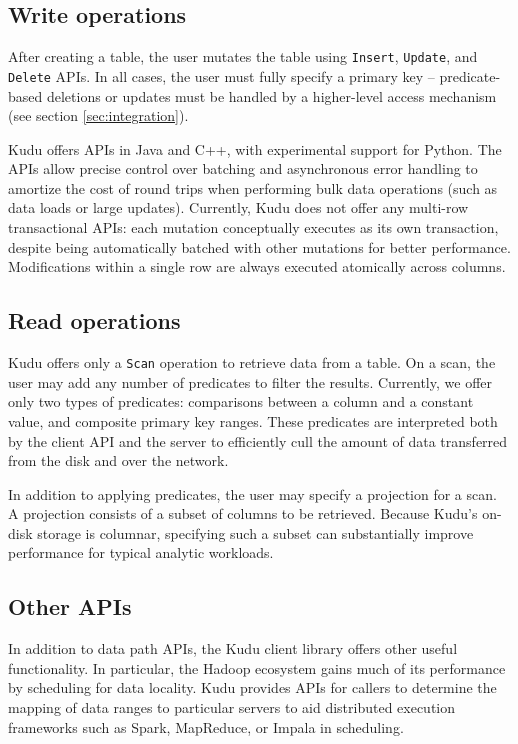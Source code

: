\documentclass[twocolumn,9pt]{article}
\begin{document}
\subsection{Write operations}
After creating a table, the user mutates the table using {\tt Insert}, {\tt Update}, and {\tt Delete}
APIs. In all cases, the user must fully specify a primary key -- predicate-based deletions or updates
must be handled by a higher-level access mechanism (see section {\ref{sec:integration}}).

Kudu offers APIs in Java and C++, with experimental support for Python. The APIs allow
precise control over batching and asynchronous error handling to amortize the cost of round trips
when performing bulk data operations (such as data loads or large updates). Currently, Kudu does
not offer any multi-row transactional APIs: each mutation conceptually executes as its own transaction,
despite being automatically batched with other mutations for better performance. Modifications within
a single row are always executed atomically across columns.

\subsection{Read operations}
Kudu offers only a {\tt Scan} operation to retrieve data from a table. On a scan, the user may add
any number of predicates to filter the results. Currently, we offer only two types of predicates:
comparisons between a column and a constant value, and composite primary key ranges. These
predicates are interpreted both by the client API and the server to efficiently cull the amount of
data transferred from the disk and over the network.

In addition to applying predicates, the user may specify a projection for a scan. A projection
consists of a subset of columns to be retrieved. Because Kudu's on-disk storage is columnar,
specifying such a subset can substantially improve performance for typical analytic workloads.

\subsection{Other APIs}
In addition to data path APIs, the Kudu client library offers other useful functionality. In particular,
the Hadoop ecosystem gains much of its performance by scheduling for data locality. Kudu provides
APIs for callers to determine the mapping of data ranges to particular servers to aid distributed
execution frameworks such as Spark, MapReduce, or Impala in scheduling.
\end{document}
